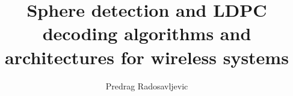 \documentclass[12pt]{ruthesis}
\title{Sphere detection and LDPC decoding algorithms and architectures for wireless systems}
\author{Predrag Radosavljevic}
\begin{document}
  \begin{frontmatter}
   \maketitle
   
   \tableofcontents
   \listoffigures
   \listoftables
%   
  \end{frontmatter}




\appendix

%
%
%
%



\end{document}
